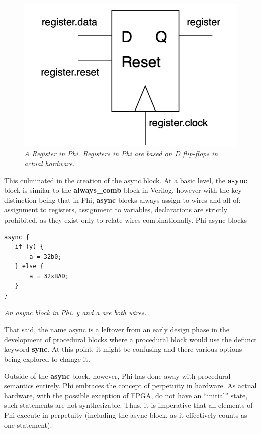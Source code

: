 \documentclass[10pt, two column]{article}
\theoremstyle{definition}
\begin{document}
\begin{figure}
  \includegraphics[width=\linewidth]{register_in_phi.png}
  \caption{\textit{A Register in Phi. Registers in Phi are based on D flip-flops in actual hardware.}}
  \label{fig: a register in Phi.}
\end{figure}

This culminated in the creation of the async block. At a basic level, the \textbf{async} block is similar to the \textbf{always\_comb} block in Verilog, however with the key distinction being that in Phi, \textbf{async} blocks always assign to wires and all of: assignment to registers, assignment to variables, declarations are strictly prohibited, as they exist only to relate wires combinationally. Phi async blocks\newline 

\begin{lstlisting}
async {
   if (y) {
       a = 32b0;
   } else {
       a = 32xBAD;
   }
}
\end{lstlisting}
\begin{center}
\textit {An async block in Phi. y and a are both wires.}
\end{center}

That said, the name async is a leftover from an early design phase in the development of procedural blocks where a procedural block would use the defunct keyword \textbf{sync}. At this point, it might be confusing and there various options being explored to change it.\newline

Outside of the \textbf{async} block, however, Phi has done away with procedural semantics entirely. Phi embraces the concept of perpetuity in hardware. As actual hardware, with the possible exception of FPGA, do not have an “initial” state, such statements are not synthesizable. Thus, it is imperative that all elements of Phi execute in perpetuity (including the async block, as it effectively counts as one statement).\newline
\end{document}

